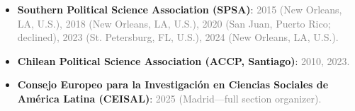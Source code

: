 \begin{itemize}
\item[\textcolor{gray}{\textbullet}] {\bf Southern Political Science Association (SPSA)}: \textcolor{gray}{2015 (New Orleans, LA, U.S.), 2018 (New Orleans, LA, U.S.), 2020 (San Juan, Puerto Rico; declined), 2023 (St. Petersburg, FL, U.S.), 2024 (New Orleans, LA, U.S.).}
\item[\textcolor{gray}{\textbullet}] {\bf Chilean Political Science Association (ACCP, Santiago)}: \textcolor{gray}{2010, 2023.}
\item[\textcolor{gray}{\textbullet}] {\bf Consejo Europeo para la Investigaci\'on en Ciencias Sociales de Am\'erica Latina (CEISAL)}: \textcolor{gray}{2025 (Madrid---full section organizer).}


\end{itemize}
